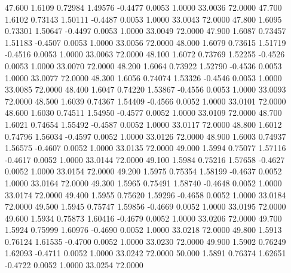   47.600   1.6109   0.72984   1.49576  -0.4477   0.0053   1.0000  33.0036  72.0000
  47.700   1.6102   0.73143   1.50111  -0.4487   0.0053   1.0000  33.0043  72.0000
  47.800   1.6095   0.73301   1.50647  -0.4497   0.0053   1.0000  33.0049  72.0000
  47.900   1.6087   0.73457   1.51183  -0.4507   0.0053   1.0000  33.0056  72.0000
  48.000   1.6079   0.73615   1.51719  -0.4516   0.0053   1.0000  33.0063  72.0000
  48.100   1.6072   0.73769   1.52255  -0.4526   0.0053   1.0000  33.0070  72.0000
  48.200   1.6064   0.73922   1.52790  -0.4536   0.0053   1.0000  33.0077  72.0000
  48.300   1.6056   0.74074   1.53326  -0.4546   0.0053   1.0000  33.0085  72.0000
  48.400   1.6047   0.74220   1.53867  -0.4556   0.0053   1.0000  33.0093  72.0000
  48.500   1.6039   0.74367   1.54409  -0.4566   0.0052   1.0000  33.0101  72.0000
  48.600   1.6030   0.74511   1.54950  -0.4577   0.0052   1.0000  33.0109  72.0000
  48.700   1.6021   0.74654   1.55492  -0.4587   0.0052   1.0000  33.0117  72.0000
  48.800   1.6012   0.74796   1.56034  -0.4597   0.0052   1.0000  33.0126  72.0000
  48.900   1.6003   0.74937   1.56575  -0.4607   0.0052   1.0000  33.0135  72.0000
  49.000   1.5994   0.75077   1.57116  -0.4617   0.0052   1.0000  33.0144  72.0000
  49.100   1.5984   0.75216   1.57658  -0.4627   0.0052   1.0000  33.0154  72.0000
  49.200   1.5975   0.75354   1.58199  -0.4637   0.0052   1.0000  33.0164  72.0000
  49.300   1.5965   0.75491   1.58740  -0.4648   0.0052   1.0000  33.0174  72.0000
  49.400   1.5955   0.75620   1.59296  -0.4658   0.0052   1.0000  33.0184  72.0000
  49.500   1.5945   0.75747   1.59856  -0.4669   0.0052   1.0000  33.0195  72.0000
  49.600   1.5934   0.75873   1.60416  -0.4679   0.0052   1.0000  33.0206  72.0000
  49.700   1.5924   0.75999   1.60976  -0.4690   0.0052   1.0000  33.0218  72.0000
  49.800   1.5913   0.76124   1.61535  -0.4700   0.0052   1.0000  33.0230  72.0000
  49.900   1.5902   0.76249   1.62093  -0.4711   0.0052   1.0000  33.0242  72.0000
  50.000   1.5891   0.76374   1.62651  -0.4722   0.0052   1.0000  33.0254  72.0000
